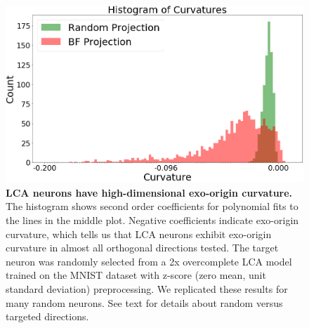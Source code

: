 \begin{figure}[h]
    \centering
    \includegraphics[width=\textwidth]{figures/iso_contour_lca_hists.png}
    \caption{\textbf{LCA neurons have high-dimensional exo-origin curvature.} The histogram shows second order coefficients for polynomial fits to the lines in the middle plot. Negative coefficients indicate exo-origin curvature, which tells us that LCA neurons exhibit exo-origin curvature in almost all orthogonal directions tested. The target neuron was randomly selected from a 2x overcomplete LCA model trained on the MNIST dataset with z-score (zero mean, unit standard deviation) preprocessing. We replicated these results for many random neurons. See text for details about random versus targeted directions.}
    \label{fig:ch4_iso_contour_lca_hists}
\end{figure}




